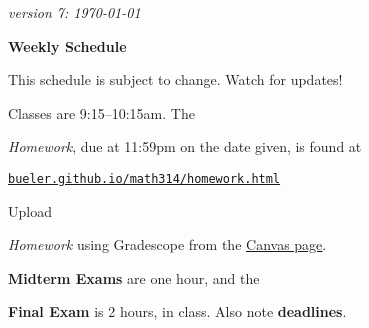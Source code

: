 \documentclass[12pt]{article}
\newcommand{\due}[1]{\strut {\color{BrickRed} \textsl{#1}}}
\newcommand{\ee}[1]{\strut {\color{Blue} \textbf{#1}}}
\newcommand{\dlinline}[1]{{\color{Purple} \textbf{#1}}}
\newcommand{\dl}[1]{{\small \dlinline{#1}}}
\begin{document}
\hfill \small \emph{version 7: \today} \normalsize

\bigskip\bigskip
\centerline{\Large \textbf{Weekly Schedule}}

\bigskip
This schedule is subject to change.  Watch for updates!

Classes are 9:15--10:15am.  The \due{Homework}, due at 11:59pm on the date given, is found at

 \quad \href{https://bueler.github.io/math314/homework.html}{\underline{\texttt{bueler.github.io/math314/homework.html}}}
 
Upload \due{Homework} using Gradescope from the \href{https://canvas.alaska.edu/courses/7017}{\underline{Canvas page}}.  \ee{Midterm Exams} are one hour, and the \ee{Final Exam} is 2 hours, in class.  Also note \dl{deadlines}.

\bigskip
\end{document}
